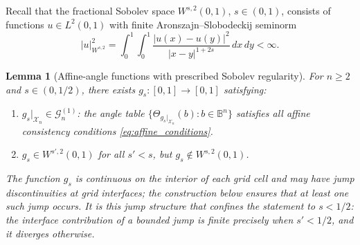 \documentclass[12pt,a4paper]{article}
\theoremstyle{plain}
\newtheorem{lemma}[lemma]{Lemma}
\theoremstyle{definition}
\theoremstyle{remark}
\newcommand{\Gclass}[2]{\mathcal{G}_{#1}^{(#2)}}
\begin{document}
Recall that the fractional Sobolev space $W^{s,2}(0,1)$, $s\in(0,1)$,
consists of functions $u\in L^2(0,1)$ with finite Aronszajn--Slobodeckij
seminorm
\begin{equation}
  |u|_{W^{s,2}}^2
  = \int_0^1\!\int_0^1\frac{|u(x)-u(y)|^2}{|x-y|^{1+2s}}\,dx\,dy < \infty.
  \label{eq:sobolev_seminorm}
\end{equation}

\begin{lemma}[Affine-angle functions with prescribed Sobolev regularity]
\label{lem:gs_construction}
For $n\geq 2$ and $s\in(0,1/2)$, there exists
$g_s:[0,1]\to[0,1]$ satisfying:
\begin{enumerate}[label=\textup{(\roman*)}]
\item $g_s|_{\mathcal{X}_n}\in\Gclass{n}{1}$: the angle table
  $\{\Theta_{g_s|_{\mathcal{X}_n}}(b) : b\in\mathbb{B}^n\}$ satisfies all affine consistency conditions
  \eqref{eq:affine_conditions}.
\item $g_s\in W^{s',2}(0,1)$ for all $s'<s$, but
  $g_s\notin W^{s,2}(0,1)$.
\end{enumerate}
The function $g_s$ is continuous on the interior of each grid cell and
may have jump discontinuities at grid interfaces; the construction
below ensures that at least one such jump occurs.
It is this jump structure that confines the statement to $s<1/2$: the
interface contribution of a bounded jump is finite precisely when
$s'<1/2$, and it diverges otherwise.
\end{lemma}
\end{document}
